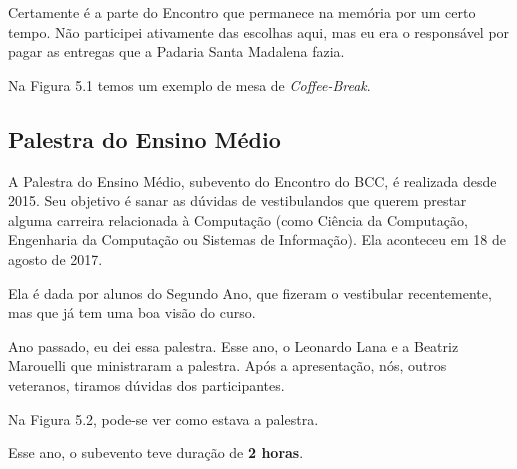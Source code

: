 \documentclass[12pt,letterpaper]{article}
\begin{document}
	Certamente é a parte do Encontro que permanece na memória por um certo tempo. Não participei ativamente das escolhas aqui, mas eu era o responsável por pagar as entregas que a Padaria Santa Madalena fazia.
	
	Na Figura 5.1 temos um exemplo de mesa de \textit{Coffee-Break}.
	
	\subsection{Palestra do Ensino Médio}
	
	A Palestra do Ensino Médio, subevento do Encontro do BCC, é realizada desde 2015. Seu objetivo é sanar as dúvidas de vestibulandos que querem prestar alguma carreira relacionada à Computação (como Ciência da Computação, Engenharia da Computação ou Sistemas de Informação). Ela aconteceu em 18 de agosto de 2017.
	
	Ela é dada por alunos do Segundo Ano, que fizeram o vestibular recentemente, mas que já tem uma boa visão do curso. 
	
	Ano passado, eu dei essa palestra. Esse ano, o Leonardo Lana e a Beatriz Marouelli que ministraram a palestra. Após a apresentação, nós, outros veteranos, tiramos dúvidas dos participantes.
	
	Na Figura 5.2, pode-se ver como estava a palestra.
	
	Esse ano, o subevento teve duração de \textbf{2 horas}.
	
\end{document}
